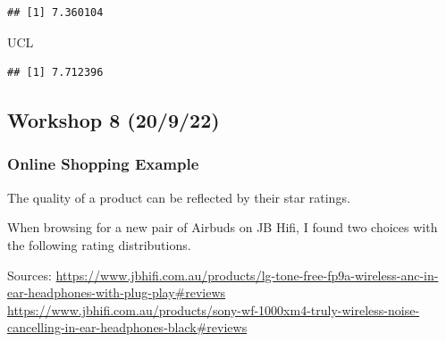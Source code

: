 \documentclass[
]{article}
\newenvironment{Shaded}{\begin{snugshade}}{\end{snugshade}}
\newcommand{\NormalTok}[1]{\textcolor[rgb]{0.80,0.80,0.80}{#1}}
\begin{document}
\begin{verbatim}
## [1] 7.360104
\end{verbatim}

\begin{Shaded}
\begin{Highlighting}[]
\NormalTok{UCL}
\end{Highlighting}
\end{Shaded}

\begin{verbatim}
## [1] 7.712396
\end{verbatim}

\hypertarget{workshop-8-20922}{%
\subsection{Workshop 8 (20/9/22)}\label{workshop-8-20922}}

\hypertarget{online-shopping-example}{%
\subsubsection{Online Shopping Example}\label{online-shopping-example}}

The quality of a product can be reflected by their star ratings.

When browsing for a new pair of Airbuds on JB Hifi, I found two choices
with the following rating distributions.

Sources:
\url{https://www.jbhifi.com.au/products/lg-tone-free-fp9a-wireless-anc-in-ear-headphones-with-plug-play\#reviews}
\url{https://www.jbhifi.com.au/products/sony-wf-1000xm4-truly-wireless-noise-cancelling-in-ear-headphones-black\#reviews}
\end{document}
